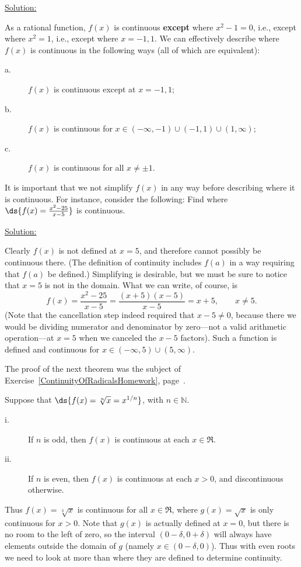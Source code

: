 \underline{Solution: }

As a rational function, $f(x)$ is continuous
{\bf except} where $x^2-1=0$, i.e., except where $x^2=1$, i.e., except
where $x=-1,1$.  We can effectively describe where $f(x)$ is continuous
in the following ways (all of which are equivalent):
\begin{description}
\item[a.] $f(x)$ is continuous except at $x=-1,1$;
\item[b.] $f(x)$ is continuous for $x\in(-\infty,-1)
\cup(-1,1)\cup(1,\infty)$;
\item[c.] $f(x)$ is continuous for all $x\ne\pm1$.
\end{description}\eex

It is important that we not simplify $f(x)$ in any way
before describing where it is continuous.  For instance,
consider the following:
\bex Find where $\ds{f(x)=\frac{x^2-25}{x-5}}$ is continuous.

\underline{Solution:} 

Clearly $f(x)$ is not defined at $x=5$, and therefore
cannot possibly be continuous there. (The definition
of continuity includes $f(a)$ in a way requiring that
$f(a)$ be defined.)  Simplifying is
desirable, but we must be sure to notice that $x=5$
is not in the domain.  What we can write, of course, is
$$f(x)=\frac{x^2-25}{x-5}=\frac{(x+5)(x-5)}{x-5}
=x+5,\qquad x\ne5.$$
(Note that the cancellation step indeed required that $x-5\ne0$,
because there we would be dividing numerator and denominator by
zero---not a valid arithmetic operation---at $x=5$ 
when we canceled the $x-5$ factors).
Such a function is defined and continuous for 
$x\in(-\infty,5)\cup(5,\infty)$.  \eex

The proof of the next theorem was the subject
of Exercise~\ref{ContinuityOfRadicalsHomework}, 
page~\pageref{ContinuityOfRadicalsHomework}.

\begin{theorem}
Suppose that $\ds{f(x)=\sqrt[n]{x}=x^{1/n}}$, with 
$n\in\mathbb{N}$. 
\begin{description}
\item[i.] If $n$ is odd, then $f(x)$ is continuous at each $x\in\Re$.
\item[ii.] If $n$ is even, then $f(x)$ is continuous at each
$x>0$, and discontinuous otherwise.
\end{description}
\label{ContinuityOfRoots}\end{theorem}

Thus $f(x)=\sqrt[3]{x}$ is continuous for all $x\in\Re$, where
$g(x)=\sqrt{x}$ is only continuous for $x>0$. Note that
$g(x)$ is actually  defined at $x=0$, but there is no room to the
left of zero, so the interval $(0-\delta,0+\delta)$ will
always have elements outside the domain of $g$ (namely
$x\in(0-\delta,0)$). Thus with even roots we need to look
at more than where they are defined to determine continuity.


